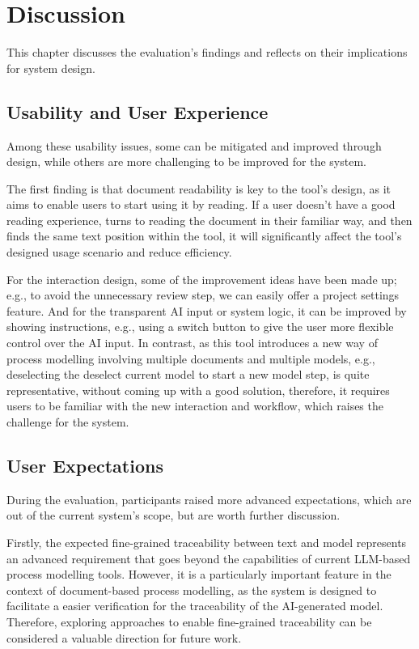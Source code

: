\FloatBarrier
\chapter{Discussion}
\label{sec:discussion}

This chapter discusses the evaluation's findings and reflects on their implications for system design.

\section{Usability and User Experience}

Among these usability issues, some can be mitigated and improved through design, while others are more challenging to be improved for the system. 

The first finding is that document readability is key to the tool's design, as it aims to enable users to start using it by reading. If a user doesn't have a good reading experience, turns to reading the document in their familiar way, and then finds the same text position within the tool, it will significantly affect the tool's designed usage scenario and reduce efficiency.

For the interaction design, some of the improvement ideas have been made up; e.g., to avoid the unnecessary review step, we can easily offer a project settings feature. And for the transparent AI input or system logic, it can be improved by showing instructions, e.g., using a switch button to give the user more flexible control over the AI input. In contrast, as this tool introduces a new way of process modelling involving multiple documents and multiple models, e.g., deselecting the deselect current model to start a new model step, is quite representative, without coming up with a good solution, therefore, it requires users to be familiar with the new interaction and workflow, which raises the challenge for the system.

\section {User Expectations}
During the evaluation, participants raised more advanced expectations, which are out of the current system's scope, but are worth further discussion.

Firstly, the expected fine-grained traceability between text and model represents an advanced requirement that goes beyond the capabilities of current LLM-based process modelling tools. However, it is a particularly important feature in the context of document-based process modelling, as 
the system is designed to facilitate a easier verification for the traceability of the AI-generated model. Therefore, exploring approaches to enable fine-grained traceability can be considered a valuable direction for future work.

